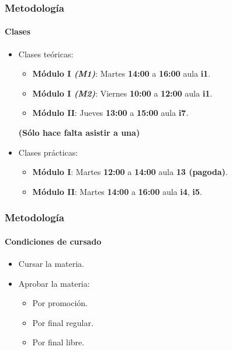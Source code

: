 \documentclass[11pt,a4paper,spanish]{beamer}
\begin{document}
\begin{frame}

    \frametitle{Metodología}
    \framesubtitle{Clases}

\begin{itemize}
    \item Clases teóricas:
    \begin{itemize}
        \item \textbf{Módulo I \emph{(M1)}}: Martes \textbf{14:00} a
            \textbf{16:00} aula \textbf{i1}.
        \item \textbf{Módulo I \emph{(M2)}}: Viernes \textbf{10:00} a
            \textbf{12:00} aula \textbf{i1}.
        \item \textbf{Módulo II}: Jueves \textbf{13:00} a \textbf{15:00} aula
            \textbf{i7}.
    \end{itemize}
        \textbf{(Sólo hace falta asistir a una)}
    \item Clases prácticas:
    \begin{itemize}
        \item \textbf{Módulo I}: Martes \textbf{12:00} a \textbf{14:00} aula
            \textbf{13 (pagoda)}.
        \item \textbf{Módulo II}: Martes \textbf{14:00} a \textbf{16:00} aula
            \textbf{i4}, \textbf{i5}.
    \end{itemize}

\end{itemize}

\end{frame}

\begin{frame}

    \frametitle{Metodología}
    \framesubtitle{Condiciones de cursado}

\begin{itemize}
    \item Cursar la materia.
    \item Aprobar la materia:
        \begin{itemize}
            \item Por promoción.
            \item Por final regular.
            \item Por final libre.
        \end{itemize}
\end{itemize}

\end{frame}
\end{document}
